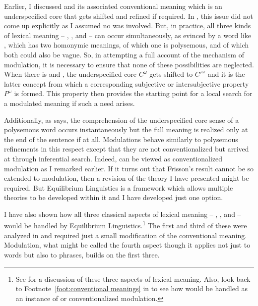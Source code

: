 Earlier, I discussed  and its associated conventional meaning which is an underspecified core that gets shifted and refined if required. In , this issue did not come up explicitly as I assumed no  was involved. But, in practice, all three kinds of lexical meaning -- , , and  -- can occur simultaneously, as evinced by a word like , which has two homonymic meanings, of which one is polysemous, and of which both could also be vague. So, in attempting a full account of the mechanism of modulation, it is necessary to ensure that none of these possibilities are neglected. When there is  and , the underspecified core $C^{\omega}$ gets shifted to $C'^{\omega}$ and it is the latter concept from which a corresponding subjective or intersubjective property $P^{\omega}$ is formed. This property then provides the starting point for a local search for a modulated meaning if such a need arises.

Additionally, as \citet{frisson:sulp} says, the comprehension of the underspecified core sense of a polysemous word occurs instantaneously but the full meaning is realized only at the end of the sentence if at all. Modulations behave similarly to polysemous refinements in this respect except that they are not conventionalized but arrived at through inferential search. Indeed,  can be viewed as conventionalized modulation as I remarked earlier. If it turns out that Frisson's result cannot be so extended to modulation, then a revision of the theory I have presented might be required. But Equilibrium Linguistics is a framework which allows multiple theories to be developed within it and I have developed just one option. 


I have also shown how all three classical aspects of lexical meaning -- , , and  -- would be handled by Equilibrium Linguistics.\footnote{See \citet[Chapter~5]{murphy:lm} for a discussion of these three aspects of lexical meaning. Also, look back to Footnote~\ref{foot:conventional meanings} in  to see how  would be handled as an instance of  or conventionalized modulation.} The first and third of these were analyzed in  and  required just a small modification of the conventional meaning. Modulation, what might be called the fourth aspect though it applies not just to words but also to phrases, builds on the first three.

